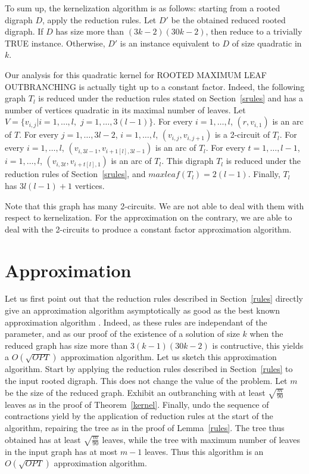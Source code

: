 \documentclass{article}
\def\RMO{R{\footnotesize{OOTED}} M{\footnotesize{AXIMUM}} L{\footnotesize{EAF}} O{\footnotesize{UTBRANCHING}} }
\begin{document}
To sum up, the kernelization algorithm is as follows: starting from a rooted digraph $D$, apply the reduction rules. Let $D'$ be the obtained reduced rooted digraph. If $D$ has size more than $(3k-2)(30k-2)$, then reduce to a trivially TRUE instance. Otherwise, $D'$ is an instance equivalent to $D$ of size quadratic in $k$.


Our analysis for this quadratic kernel for \RMO is actually tight up to a constant factor.
Indeed, the following graph $T_l$ is reduced under the reduction rules stated on Section~\ref{srules} and has a number of vertices quadratic in its maximal number of leaves. Let $V=\{v_{i,j}|i=1,\dots,l,$ $j=1,\dots,3(l-1)\}$. For every $i=1,\dots,l$, $(r,v_{i,1})$ is an arc of $T$. For every $j=1,\dots,3l-2$, $i=1,\dots,l$, $(v_{i,j},v_{i,j+1})$ is a 2-circuit of $T_l$. For every $i=1,\dots,l$, $(v_{i,3l-1},v_{i+1 [l],3l-1})$ is an arc of $T_l$. For every $t=1,\dots,l-1$, $i=1,\dots,l$, $(v_{i,3t},v_{i+t[l],1})$ is an arc of $T_l$. This digraph $T_l$ is reduced under the reduction rules of Section~\ref{srules}, and $maxleaf(T_l)=2(l-1)$. Finally, $T_l$ has $3l(l-1)+1$ vertices. 


Note that this graph has many 2-circuits. We are not able to deal with them with respect to kernelization. For the approximation on the contrary, we are able to deal with the 2-circuits to produce a constant factor approximation algorithm.





\section{Approximation}\label{approx}
Let us first point out that the reduction rules described in Section~\ref{rules} directly give an approximation algorithm asymptotically as good as the best known approximation algorithm \cite{DrescherMaxLeaf}. Indeed, as these rules are independant of the parameter, and as our proof of the existence of a solution of size $k$ when the reduced graph has size more than $3(k-1)(30k-2)$ is contructive, this yields a $O(\sqrt{OPT})$ approximation algorithm. Let us sketch this approximation algorithm. Start by applying the reduction rules described in Section~\ref{rules} to the input rooted digraph. This does not change the value of the problem. Let $m$ be the size of the reduced graph. Exhibit an outbranching with at least $\sqrt{\frac{m}{90}}$ leaves as in the proof of Theorem~\ref{kernel}. Finally, undo the sequence of contractions yield by the application of reduction rules at the start of the algorithm, repairing the tree as in the proof of Lemma~\ref{rules}. The tree thus obtained has at least $\sqrt{\frac{m}{90}}$ leaves, while the tree with maximum number of leaves in the input graph has at most $m-1$ leaves. Thus this algorithm is an $O(\sqrt{OPT})$ approximation algorithm.
\end{document}
